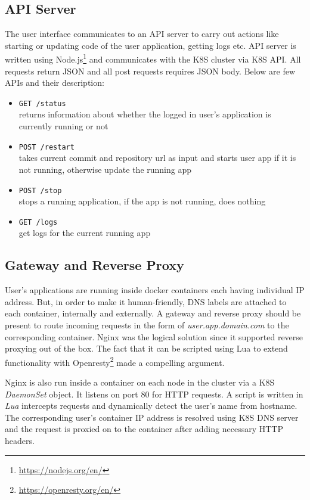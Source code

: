\documentclass[DD]{iitmdiss}
\begin{document}
\subsection{API Server}
The user interface communicates to an API server to carry out actions like starting or updating code of the user application, getting logs etc. API server is written using Node.js\footnote{\url{https://nodejs.org/en/}} and communicates with the K8S cluster via K8S API. All requests return JSON and all post requests requires JSON body. Below are few APIs and their description:
\begin{itemize}
	\item \verb|GET /status| \\
		returns information about whether the logged in user's application is currently running or not
	\item \verb|POST /restart| \\
		takes current commit and repository url as input and starts user app if it is not running, otherwise update the running app
	\item \verb|POST /stop| \\
		stops a running application, if the app is not running, does nothing
	\item \verb|GET /logs| \\
		get logs for the current running app
\end{itemize}

\subsection{Gateway and Reverse Proxy}
User's applications are running inside docker containers each having individual IP address. But, in order to make it human-friendly, DNS labels are attached to each container, internally and externally. A gateway and reverse proxy should be present to route incoming requests in the form of \textit{user.app.domain.com} to the corresponding container. Nginx was the logical solution since it supported reverse proxying out of the box. The fact that it can be scripted using Lua to extend functionality with Openresty\footnote{\url{https://openresty.org/en/}} made a compelling argument.

Nginx is also run inside a container on each node in the cluster via a K8S \textit{DaemonSet} object. It listens on port 80 for HTTP requests. A script is written in \textit{Lua} intercepts requests and dynamically detect the user's name from hostname. The corresponding user's container IP address is resolved using K8S DNS server and the request is proxied on to the container after adding necessary HTTP headers. 
\end{document}
